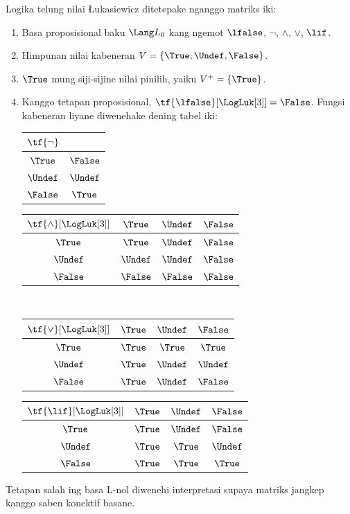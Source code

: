 \documentclass[../../../include/open-logic-section]{subfiles}
\begin{document}
\begin{defn}
Logika telung nilai \L ukasiewicz ditetepake nganggo matriks iki:
\begin{enumerate}
  \item Basa proposisional baku $\Lang L_0$ kang ngemot
  $\lfalse$, $\lnot$, $\land$, $\lor$, $\lif$.
  \item Himpunan nilai kabeneran $V = \{\True, \Undef, \False\}$.
  \item $\True$ mung siji-sijine nilai pinilih, yaiku
  $V^+ = \{\True\}$.
  \item Kanggo tetapan proposisional,
  $\tf{\lfalse}[\LogLuk[3]] = \False$. Fungsi kabeneran liyane
  diwenehake dening tabel iki:
  \begin{center}
    \begin{tabular}{c|c} 
      $\tf{\lnot}$ & \\ 
      \hline  
      $\True$ & $\False$ \\ 
      $\Undef$ & $\Undef$ \\
      $\False$ & $\True$ 
    \end{tabular}
    \quad
    \begin{tabular}{c|ccc} 
      $\tf{\land}[\LogLuk[3]]$ & $\True$ & $\Undef$ & $\False$ \\ 
      \hline 
      $\True$ & $\True$ & $\Undef$ & $\False$ \\ 
      $\Undef$ & $\Undef$ & $\Undef$ & $\False$\\ 
      $\False$ & $\False$ & $\False$ & $\False$ 
    \end{tabular}
    \\[2ex]
    \begin{tabular}{c|ccc} 
      $\tf{\lor}[\LogLuk[3]]$ & $\True$ & $\Undef$ & $\False$ \\ 
      \hline 
      $\True$ & $\True$ & $\True$ & $\True$ \\ 
      $\Undef$ & $\True$ & $\Undef$ & $\Undef$ \\
      $\False$ & $\True$ & $\Undef$ & $\False$ 
    \end{tabular}
    \quad
    \begin{tabular}{c|ccc} 
      $\tf{\lif}[\LogLuk[3]]$ & $\True$ & $\Undef$ & $\False$ \\ 
      \hline 
      $\True$ & $\True$ & $\Undef$ & $\False$ \\ 
      $\Undef$ & $\True$ & $\True$ & $\Undef$  \\ 
      $\False$ & $\True$ & $\True$ & $\True$ 
    \end{tabular}
  \end{center} 
\end{enumerate}
Tetapan salah ing basa L-nol diwenehi interpretasi supaya matriks jangkep kanggo saben konektif basane.
\end{defn}
\end{document}
